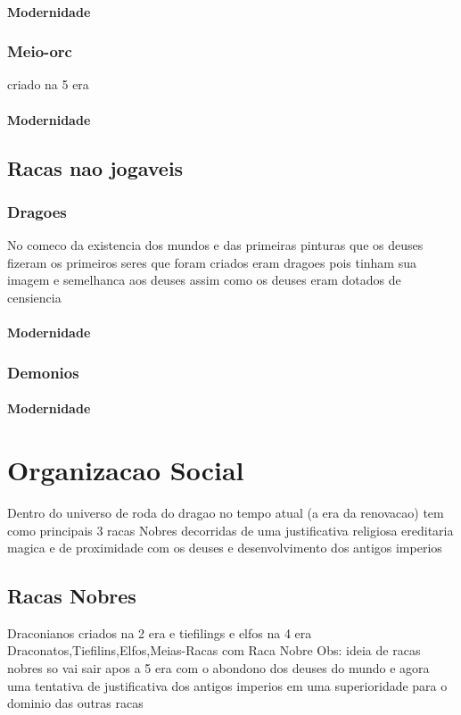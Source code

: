 \documentclass{book}
\begin{document}
\subsubsection{Modernidade}

\subsection{Meio-orc}
criado na 5 era 
\subsubsection{Modernidade}

\section{Racas nao jogaveis}
\subsection{Dragoes}
No comeco da existencia dos mundos e das primeiras pinturas que os deuses fizeram os primeiros 
seres que foram criados eram dragoes pois tinham sua imagem e semelhanca aos deuses assim como
os deuses eram dotados de censiencia 
\subsubsection*{Modernidade}

\subsection{Demonios} 
\subsubsection*{Modernidade}
\chapter{Organizacao Social}

Dentro do universo de roda do dragao no tempo atual (a era da renovacao) tem como principais 3 
racas Nobres decorridas de uma justificativa religiosa ereditaria magica e de proximidade com os 
deuses e desenvolvimento dos antigos imperios
\section{Racas Nobres}
Draconianos criados na 2 era e tiefilings e elfos na 4 era 
Draconatos,Tiefilins,Elfos,Meias-Racas com Raca Nobre
Obs: ideia de racas nobres so vai sair apos a 5 era com o abondono dos deuses do mundo e agora 
uma tentativa de justificativa dos antigos imperios em uma superioridade para o dominio das 
outras racas 
\end{document}
